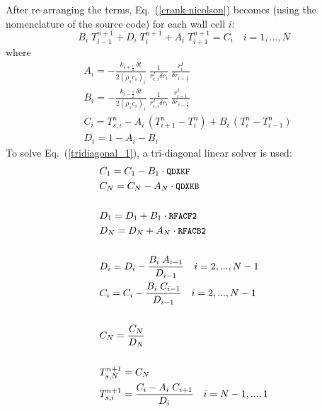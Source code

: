 After re-arranging the terms, Eq.~(\ref{crank-nicolson}) becomes (using the nomenclature of the source code) for each wall cell
$i$:
 \begin{equation}
\label{tridiagonal_1}
  B_i \; T_{i-1}^{n+1} + D_i \; T_{i}^{n+1} + A_i \; T_{i+1}^{n+1} = C_i \quad i=1,...,N
\end{equation}
where
\begin{equation}
\label{tridiagonal_2}
\begin{split}
& A_i = -\frac{k_{i+\frac{1}{2}} \, \delta t}{2(\rho_s c_s)_i} \; \frac{1}{r_{c,i}^I \delta r_i} \; \frac{r_{i}^I}{\delta
r_{i+\frac{1}{2}}}  \\
& B_i = -\frac{k_{i-\frac{1}{2}} \, \delta t}{2(\rho_s c_s)_i} \; \frac{1}{r_{c,i}^I \delta r_i} \; \frac{r_{i-1}^I}{\delta
r_{i-\frac{1}{2}}}   \\
& C_i = T_{s,i}^{n}-A_i \, (T_{i+1}^n-T_i^n) + B_i \, (T_{i}^n-T_{i-1}^n)  \\
& D_i = 1-A_i-B_i
\end{split}
\end{equation}
To solve Eq.~(\ref{tridiagonal_1}), a tri-diagonal linear solver is used:
\begin{equation}
\begin{split}
& C_1 = C_1 - B_1 \cdot \texttt{\small QDXKF} \\
& C_N = C_N - A_N \cdot \texttt{\small QDXKB} \\
& \\
& D_1 = D_1 + B_1 \cdot \texttt{\small RFACF2} \\
& D_N = D_N + A_N \cdot \texttt{\small RFACB2} \\
& \\
& D_i = D_i - \frac{B_i \; A_{i-1}}{D_{i-1}} \quad i = 2, ..., N-1 \\
& C_i = C_i - \frac{B_i \; C_{i-1}}{D_{i-1}} \quad i = 2, ..., N-1\\
& \\
& C_N = \frac{C_N}{D_N} \\
& \\
& T^{n+1}_{s,N} = C_N \\
& T^{n+1}_{s,i} = \frac{C_i - A_i \; C_{i+1}}{D_i} \quad i = N-1,..., 1
\end{split}
\end{equation}
